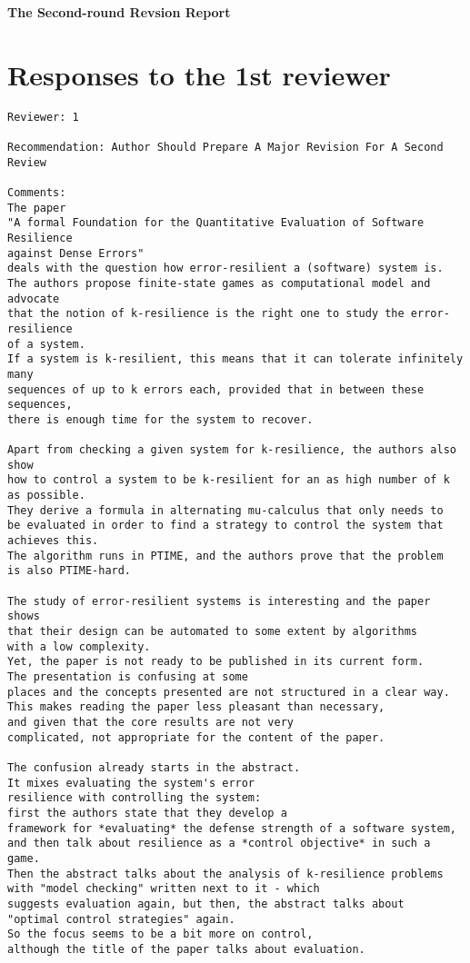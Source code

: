 \documentclass[times,10pt,twocolumn]{article}
\begin{document}
\newpage 
\begin{center} 
\bf\LARGE The Second-round Revsion Report 
\end{center} 
\section{Responses to the 1st reviewer} 

\begin{verbatim} 
Reviewer: 1

Recommendation: Author Should Prepare A Major Revision For A Second Review

Comments:
The paper 
"A formal Foundation for the Quantitative Evaluation of Software Resilience 
against Dense Errors"
deals with the question how error-resilient a (software) system is. 
The authors propose finite-state games as computational model and advocate 
that the notion of k-resilience is the right one to study the error-resilience 
of a system. 
If a system is k-resilient, this means that it can tolerate infinitely many 
sequences of up to k errors each, provided that in between these sequences, 
there is enough time for the system to recover.

Apart from checking a given system for k-resilience, the authors also show 
how to control a system to be k-resilient for an as high number of k as possible. 
They derive a formula in alternating mu-calculus that only needs to 
be evaluated in order to find a strategy to control the system that achieves this.
The algorithm runs in PTIME, and the authors prove that the problem 
is also PTIME-hard.

The study of error-resilient systems is interesting and the paper shows 
that their design can be automated to some extent by algorithms 
with a low complexity. 
Yet, the paper is not ready to be published in its current form. 
The presentation is confusing at some 
places and the concepts presented are not structured in a clear way. 
This makes reading the paper less pleasant than necessary, 
and given that the core results are not very 
complicated, not appropriate for the content of the paper. 

The confusion already starts in the abstract. 
It mixes evaluating the system's error 
resilience with controlling the system: 
first the authors state that they develop a 
framework for *evaluating* the defense strength of a software system, 
and then talk about resilience as a *control objective* in such a game. 
Then the abstract talks about the analysis of k-resilience problems 
with "model checking" written next to it - which 
suggests evaluation again, but then, the abstract talks about 
"optimal control strategies" again. 
So the focus seems to be a bit more on control, 
although the title of the paper talks about evaluation.
\end{verbatim} 
\end{document}
